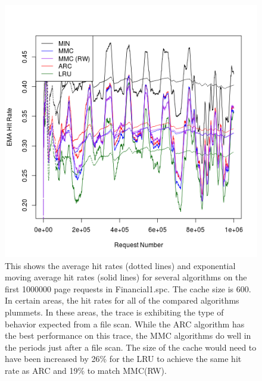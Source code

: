   \begin{figure}
  \centering
  \includegraphics[width=6in]{../media/ts_600_600_2400_2.png}
  \caption[Rolling hit rate for 600 page caches on trace Financial1.spc]{This
  shows the average hit rates (dotted lines) and exponential moving average hit
  rates (solid lines) for several algorithms on the first 1000000 page requests
  in Financial1.spc. The cache size is 600. In certain areas, the hit rates for
  all of the compared algorithms plummets. In these areas, the trace is
  exhibiting the type of behavior expected from a file scan. While the ARC
  algorithm has the best performance on this trace, the MMC algorithms do well
  in the periods just after a file scan. The size of the cache would need to
  have been increased by 26\% for the LRU to achieve the same hit rate as ARC
  and 19\% to match MMC(RW).}
  \label{fig:ts_600_financial1}
  \end{figure}

